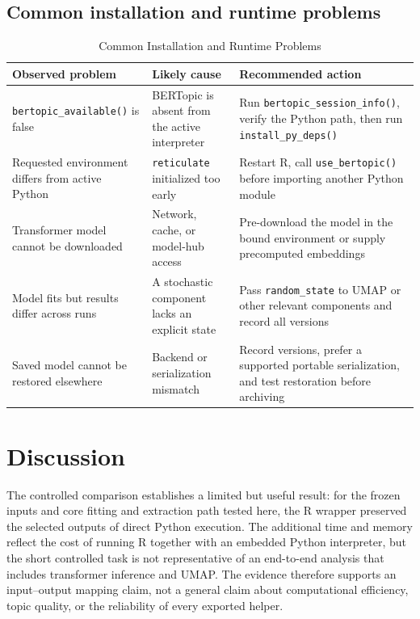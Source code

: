 \documentclass[12pt]{article}
\newcommand{\pkg}[1]{\texttt{#1}}
\newcommand{\code}[1]{\texttt{#1}}
\newcommand{\fcode}[1]{\nolinkurl{#1}}
\begin{document}
\subsection{Common installation and runtime problems}

\begin{table}[htbp]
\centering
\caption{Common Installation and Runtime Problems}
\label{tab:diagnostics}
\begin{tabularx}{\linewidth}{>{\raggedright\arraybackslash}p{3.4cm}
                             >{\raggedright\arraybackslash}X
                             >{\raggedright\arraybackslash}p{3.7cm}}
\toprule
Observed problem & Likely cause & Recommended action \\
\midrule
\fcode{bertopic_available()} is false & BERTopic is absent from the active interpreter & Run \fcode{bertopic_session_info()}, verify the Python path, then run \fcode{install_py_deps()} \\
Requested environment differs from active Python & \pkg{reticulate} initialized too early & Restart R, call \code{use\_bertopic()} before importing another Python module \\
Transformer model cannot be downloaded & Network, cache, or model-hub access & Pre-download the model in the bound environment or supply precomputed embeddings \\
Model fits but results differ across runs & A stochastic component lacks an explicit state & Pass \code{random\_state} to UMAP or other relevant components and record all versions \\
Saved model cannot be restored elsewhere & Backend or serialization mismatch & Record versions, prefer a supported portable serialization, and test restoration before archiving \\
\bottomrule
\end{tabularx}
\end{table}

\section{Discussion}

The controlled comparison establishes a limited but useful result: for the frozen inputs and core fitting and extraction path tested here, the R wrapper preserved the selected outputs of direct Python execution. The additional time and memory reflect the cost of running R together with an embedded Python interpreter, but the short controlled task is not representative of an end-to-end analysis that includes transformer inference and UMAP. The evidence therefore supports an input--output mapping claim, not a general claim about computational efficiency, topic quality, or the reliability of every exported helper.
\end{document}
